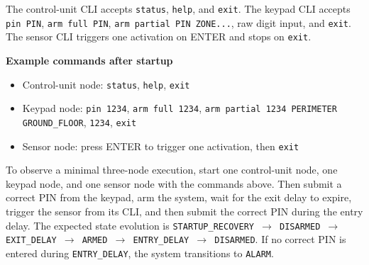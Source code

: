 The control-unit CLI accepts \texttt{status}, \texttt{help}, and \texttt{exit}.
The keypad CLI accepts \texttt{pin PIN}, \texttt{arm full PIN},
\texttt{arm partial PIN ZONE...}, raw digit input, and \texttt{exit}. The
sensor CLI triggers one activation on ENTER and stops on \texttt{exit}.

\textbf{Example commands after startup}

\begin{itemize}
  \item Control-unit node: \texttt{status}, \texttt{help}, \texttt{exit}
  \item Keypad node: \texttt{pin 1234}, \texttt{arm full 1234},
  \texttt{arm partial 1234 PERIMETER GROUND\_FLOOR}, \texttt{1234},
  \texttt{exit}
  \item Sensor node: press ENTER to trigger one activation, then \texttt{exit}
\end{itemize}

To observe a minimal three-node execution, start one control-unit node, one
keypad node, and one sensor node with the commands above. Then submit a
correct PIN from the keypad, arm the system, wait for the exit delay to
expire, trigger the sensor from its CLI, and then submit the correct PIN
during the entry delay. The expected state evolution is
\texttt{STARTUP\_RECOVERY $\rightarrow$ DISARMED $\rightarrow$ EXIT\_DELAY
$\rightarrow$ ARMED $\rightarrow$ ENTRY\_DELAY $\rightarrow$ DISARMED}. If no
correct PIN is entered during \texttt{ENTRY\_DELAY}, the system transitions to
\texttt{ALARM}.
